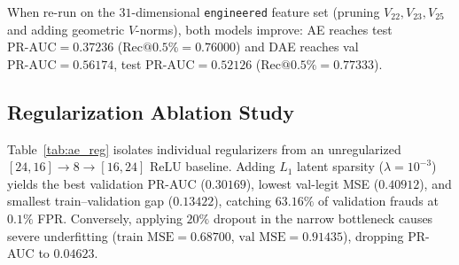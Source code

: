 When re-run on the $31$-dimensional \texttt{engineered} feature set
(pruning $V_{22}, V_{23}, V_{25}$ and adding geometric $V$-norms), both models
improve: AE reaches test $\text{PR-AUC} = 0.37236$ ($\text{Rec@0.5\%} = 0.76000$)
and DAE reaches val $\text{PR-AUC} = 0.56174$, test $\text{PR-AUC} = 0.52126$
($\text{Rec@0.5\%} = 0.77333$).

\subsection{Regularization Ablation Study}
\label{sec:ae_regularization}

Table~\ref{tab:ae_reg} isolates individual regularizers from an unregularized
$[24, 16] \to 8 \to [16, 24]$ ReLU baseline.  Adding $L_1$ latent sparsity
($\lambda = 10^{-3}$) yields the best validation PR-AUC ($0.30169$), lowest
val-legit MSE ($0.40912$), and smallest train--validation gap ($0.13422$),
catching $63.16\%$ of validation frauds at $0.1\%$ FPR.  Conversely, applying
$20\%$ dropout in the narrow bottleneck causes severe underfitting
($\text{train MSE} = 0.68700$, $\text{val MSE} = 0.91435$), dropping PR-AUC to
$0.04623$.

\begin{table}[t]
\caption{Regularization Ablation on Validation Split ($d=31$, Bottleneck $k=8$)}
\label{tab:ae_reg}
\centering
\footnotesize
{}
\end{table}

